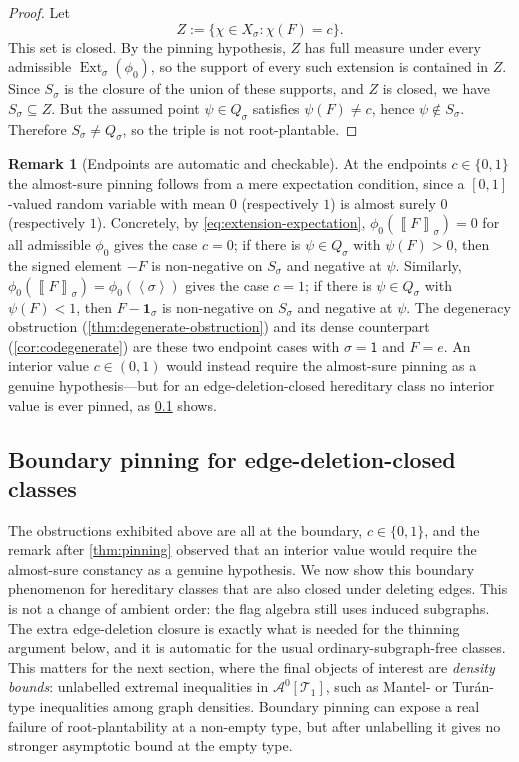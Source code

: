 \documentclass[11pt]{article}
\theoremstyle{definition}
\newtheorem{remark}[remark]{Remark}
\newcommand{\A}{\mathcal{A}}
\newcommand{\T}{\mathcal{T}}
\newcommand{\Ext}{\operatorname{Ext}}
\newcommand{\brak}[1]{\left\langle #1\right\rangle}
\newcommand{\avg}[2]{\left\llbracket #1 \right\rrbracket_{#2}}
\newcommand{\one}{\mathbf 1}
\newcommand{\vtype}{\mathsf{1}}
\begin{document}
\begin{proof}
Let
\[
  Z:=\{\chi\in X_\sigma:\chi(F)=c\}.
\]
This set is closed.  By the pinning hypothesis, $Z$ has full measure under every
admissible $\Ext_\sigma(\phi_0)$, so the support of every such extension is contained in
$Z$.  Since $S_\sigma$ is the closure of the union of these supports, and $Z$ is closed,
we have $S_\sigma\subseteq Z$.  But the assumed point $\psi\in Q_\sigma$ satisfies
$\psi(F)\ne c$, hence $\psi\notin S_\sigma$.  Therefore $S_\sigma\ne Q_\sigma$, so the
triple is not root-plantable.
\end{proof}

\begin{remark}[Endpoints are automatic and checkable]
At the endpoints $c\in\{0,1\}$ the almost-sure pinning follows from a mere
expectation condition, since a $[0,1]$-valued random variable with mean $0$
(respectively $1$) is almost surely $0$ (respectively $1$).  Concretely, by
\eqref{eq:extension-expectation}, $\phi_0(\avg{F}{\sigma})=0$ for all admissible
$\phi_0$ gives the case $c=0$; if there is $\psi\in Q_\sigma$ with $\psi(F)>0$, then
the signed element $-F$ is non-negative on $S_\sigma$ and negative at $\psi$.  Similarly,
$\phi_0(\avg{F}{\sigma})=\phi_0(\brak\sigma)$ gives the case $c=1$; if there is
$\psi\in Q_\sigma$ with $\psi(F)<1$, then $F-\one_\sigma$ is non-negative on
$S_\sigma$ and negative at $\psi$.  The degeneracy obstruction
(\cref{thm:degenerate-obstruction}) and its dense
counterpart (\cref{cor:codegenerate}) are these two endpoint cases with $\sigma=\vtype$
and $F=e$.  An interior value $c\in(0,1)$ would instead require the almost-sure pinning as a
genuine hypothesis---but for an edge-deletion-closed hereditary class no interior value is
ever pinned, as \cref{subsec:boundary} shows.
\end{remark}

\subsection{Boundary pinning for edge-deletion-closed classes}\label{subsec:boundary}

The obstructions exhibited above are all at the boundary, $c\in\{0,1\}$, and the remark
after \cref{thm:pinning} observed that an interior value would require the almost-sure
constancy as a genuine hypothesis.  We now show this boundary phenomenon for hereditary
classes that are also closed under deleting edges.  This is not a change of ambient order:
the flag algebra still uses induced subgraphs.  The extra edge-deletion closure is exactly
what is needed for the thinning argument below, and it is automatic for the usual
ordinary-subgraph-free classes.  This matters for the next section, where the final objects
of interest are \emph{density bounds}: unlabelled extremal inequalities in $\A^0[\T_1]$,
such as Mantel- or Tur\'an-type inequalities among graph densities.  Boundary pinning can
expose a real failure of root-plantability at a non-empty type, but after unlabelling it
gives no stronger asymptotic bound at the empty type.
\end{document}
